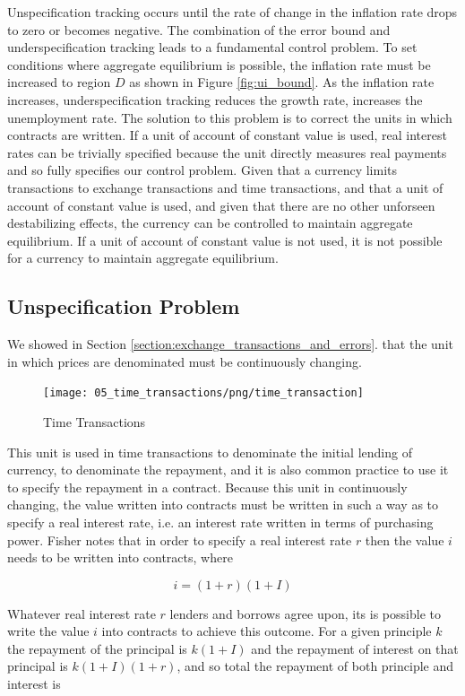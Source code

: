 Unspecification tracking occurs until the rate of change in the inflation rate drops to zero or
becomes negative. The combination of the error bound and underspecification tracking leads to a
fundamental control problem. To set conditions where aggregate equilibrium is possible, the
inflation rate must be increased to region $D$ as shown in Figure \ref{fig:ui_bound}. As the
inflation rate increases, underspecification tracking reduces the growth rate, increases the
unemployment rate. The solution to this problem is to correct the units in which contracts are
written. If a unit of account of constant value is used, real interest rates can be trivially
specified because the unit directly measures real payments and so fully specifies our control
problem. Given that a currency limits transactions to exchange transactions and time transactions,
and that a unit of account of constant value is used, and given that there are no other unforseen
destabilizing effects, the currency can be controlled to maintain aggregate equilibrium. If a unit
of account of constant value is not used, it is not possible for a currency to maintain aggregate
equilibrium.

\subsection{Unspecification Problem}

We showed in Section \ref{section:exchange_transactions_and_errors}. that the unit in which prices are
denominated must be continuously changing.

\begin{figure}[H]
\centering
\texttt{[image: 05\_time\_transactions/png/time\_transaction]}
\caption{Time Transactions}
\label{fig:time_transaction_contracts}
\end{figure}

This unit is used in time transactions to denominate the initial lending of currency, to denominate
the repayment, and it is also common practice to use it to specify the repayment in a contract.
Because this unit in continuously changing, the value written into contracts must be written in such
a way as to specify a real interest rate, i.e. an interest rate written in terms of purchasing
power. Fisher \cite{fisher1907} notes that in order to specify a real interest rate $r$ then the
value $i$ needs to be written into contracts, where

\[
    i = (1+r)(1+I)
\]

Whatever real interest rate $r$ lenders and borrows agree upon, its is possible to write the value
$i$ into contracts to achieve this outcome. For a given principle $k$ the repayment of the principal
is $k(1+I)$ and the repayment of interest on that principal is $k(1+I)(1+r)$, and so total the
repayment of both principle and interest is

